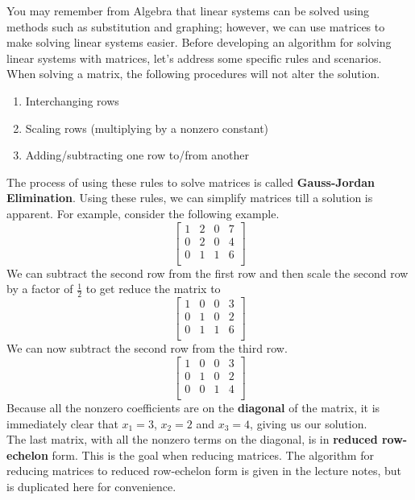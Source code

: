 \documentclass[11pt,fleqn]{article}
\begin{document}
\begin{center}
\begin{tcolorbox}[title={\fontsize{13pt}{13pt}\selectfont Solving Linear Systems},enforce breakable, pad at break=4mm, colframe=darkcrimson!100,colback=black!1,width=.9\linewidth,sharp corners=north]
You may remember from Algebra that linear systems can be solved using methods such as substitution and graphing; however, we can use matrices to make solving linear systems easier. Before developing an algorithm for solving linear systems with matrices, let's address some specific rules and scenarios. \\
When solving a matrix, the following procedures will not alter the solution.
\begin{enumerate}
\item Interchanging rows \\
\item Scaling rows (multiplying by a nonzero constant) \\
\item Adding/subtracting one row to/from another \\
\end{enumerate}
The process of using these rules to solve matrices is called \textbf{Gauss-Jordan Elimination}. Using these rules, we can simplify matrices till a solution is apparent. For example, consider the following example.
$$\left[
\begin{array}{ccc|c}
1 & 2 & 0 & 7 \\
0 & 2 & 0 & 4 \\
0 & 1 & 1 & 6 \\
\end{array}
\right]$$
We can subtract the second row from the first row and then scale the second row by a factor of $\frac{1}{2}$ to get reduce the matrix to
$$\left[
\begin{array}{ccc|c}
1 & 0 & 0 & 3 \\
0 & 1 & 0 & 2 \\
0 & 1 & 1 & 6 \\
\end{array}
\right]$$
We can now subtract the second row from the third row.
$$\left[
\begin{array}{ccc|c}
1 & 0 & 0 & 3 \\
0 & 1 & 0 & 2 \\
0 & 0 & 1 & 4 \\
\end{array}
\right]$$
Because all the nonzero coefficients are on the \textbf{diagonal} of the matrix, it is immediately clear that $x_1 = 3$, $x_2 = 2$ and $x_3 = 4$, giving us our solution.\\
The last matrix, with all the nonzero terms on the diagonal, is in \textbf{reduced row-echelon} form. This is the goal when reducing matrices. The algorithm for reducing matrices to reduced row-echelon form is given in the lecture notes, but is duplicated here for convenience.\\


\end{tcolorbox}
\end{center}
\end{document}
